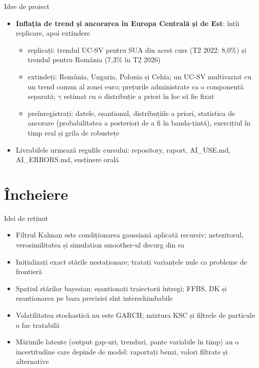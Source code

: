 \begin{frame}{Idee de proiect}
\itemsize{\small}
\begin{itemize}
    \item \textbf{Inflația de trend și ancorarea în Europa Centrală și de Est}: întîi replicare, apoi extindere
    \begin{itemize}
        \item replicați: trendul UC-SV pentru SUA din acest curs (T2 2022: 8{,}0\%) și trendul pentru România (7{,}3\% în T2 2026)
        \item extindeți: România, Ungaria, Polonia și Cehia; un UC-SV multivariat cu un trend comun al zonei euro; prețurile administrate ca o componentă separată; $\gamma$ estimat cu o distribuție a priori în loc să fie fixat
        \item preînregistrați: datele, eșantionul, distribuțiile a priori, statistica de ancorare (probabilitatea a posteriori de a fi în banda-țintă), exercițiul în timp real și grila de robustețe
    \end{itemize}
    \item Livrabilele urmează regulile cursului: repository, raport, AI\_USE.md, AI\_ERRORS.md, susținere orală
\end{itemize}
\end{frame}


\section{Încheiere}

\begin{frame}{Idei de reținut}
\itemsize{\small}
\begin{itemize}
    \item Filtrul Kalman este condiționarea gaussiană aplicată recursiv; netezitorul, verosimilitatea și simulation smoother-ul decurg din ea
    \item Inițializați exact stările nestaționare; tratați varianțele nule ca probleme de frontieră
    \item Spațiul stărilor bayesian: eșantionați traiectorii întregi; FFBS, DK și eșantionarea pe baza preciziei sînt interschimbabile
    \item Volatilitatea stochastică nu este GARCH; mixtura KSC și filtrele de particule o fac tratabilă
    \item Mărimile latente (output gap-uri, trenduri, pante variabile în timp) au o incertitudine care depinde de model: raportați benzi, valori filtrate și alternative
\end{itemize}
\end{frame}

